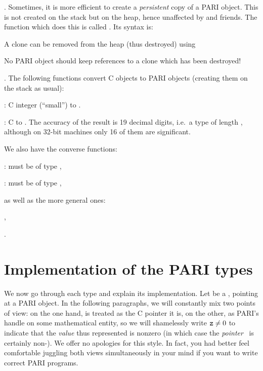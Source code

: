 .\label{se:clone}
Sometimes, it is more efficient to create a \emph{persistent} copy of a PARI
object. This is not created on the stack but on the heap, hence unaffected by
 and friends. The function which does this is called
. Its syntax is:


A clone can be removed from the heap (thus destroyed) using


\noindent No PARI object should keep references to a clone which has been
destroyed!

.
The following functions convert C objects to PARI objects (creating them on
the stack as usual):

: C  integer  (``small'') to .

: C  to . The accuracy of
the result is 19 decimal digits, i.e.~a type  of length
, although on 32-bit machines only 16 of them are
significant.

\noindent We also have the converse functions:

:  must be of type ,

:  must be of type ,

\noindent as well as the more general ones:

,

.

\section{Implementation of the PARI types}
\label{se:impl}

\noindent
We now go through each type and explain its implementation. Let  be a
, pointing at a PARI object. In the following paragraphs, we will
constantly mix two points of view: on the one hand,  is treated as the
C pointer it is, on the other, as PARI's handle on some mathematical entity,
so we will shamelessly write ${\tt z} \ne 0$ to indicate that the
\emph{value} thus represented is nonzero (in which case the
\emph{pointer}~ is certainly non-). We offer no apologies
for this style. In fact, you had better feel comfortable juggling both views
simultaneously in your mind if you want to write correct PARI programs.

